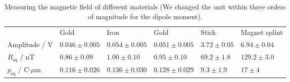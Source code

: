 \begin{table}[htb]
\caption{Measuring the magnetic field of different materials (We changed the unit within three orders of magnitude 
for the dipole moment).}
\begin{tabular}{ l| p{2.3cm}|p{2.3cm}|p{2.3cm}|p{2.3cm}|p{2.3cm}}
 \rowcolor{tabcolor}& Gold & Iron & Gold  & Stick & Magnet splint \\ 
Amplitude / V &$0.046 \pm 0.005$&$0.054 \pm 0.005$&$0.051 \pm 0.005$&$3.72 \pm 0.05$&$6.94 \pm 0.04$\\
$B_{\mathrm{sq}}$ / nT  &$0.86 \pm 0.09$ &$1.00 \pm 0.10$ &$0.95 \pm 0.10$ &$69.2 \pm 1.8$ &$129.2 \pm 3.0$ \\ 
$p_{\mathrm{sq}}$ / C$\cdot\mu$m  &$0.116 \pm 0.026$&$0.136 \pm 0.030$&$0.128 \pm 0.029$&$9.3 \pm 1.9$&$17 \pm 4$\\
\end{tabular}
\label{tab:materials}
\end{table}
\FloatBarrier
